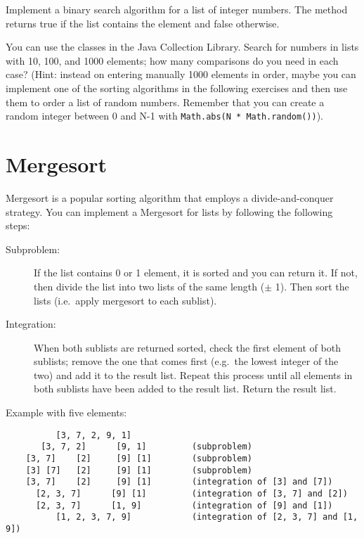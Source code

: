 \documentclass{article}
\begin{document}
Implement a binary search algorithm for a list of integer numbers. The
method returns true if the list contains the element and false
otherwise. 

You
can use the classes in the Java Collection Library. Search for numbers
in lists with 10, 100, and 1000 elements; how many comparisons do you
need in each case? (Hint: instead on entering manually 1000 elements
in order, maybe you can implement one of the sorting algorithms in the
following exercises and then use them to order a list of random
numbers. Remember that you can create a random integer between 0 and
N-1 with \verb+Math.abs(N * Math.random())+).

\section{Mergesort}
\label{sec:mergesort}

Mergesort is a popular sorting algorithm that employs a
divide-and-conquer strategy. You can implement a Mergesort for lists
by following the following steps: 

\begin{description}
\item[Subproblem: ] If the list contains 0 or 1 element, it is sorted
  and you can return it. If not, then divide the list into two lists
  of the same length ($\pm$ 1). Then sort the lists (i.e.~apply
  mergesort to each sublist).
\item[Integration: ] When both sublists are returned sorted, check the
  first element of both sublists; remove the one that comes first
  (e.g.~the lowest integer of the two) and add it to the result
  list. Repeat this process until all elements in both sublists have
  been added to the result list. Return the result list. 
\end{description}

Example with five elements: 

\begin{verbatim}
          [3, 7, 2, 9, 1]            
       [3, 7, 2]      [9, 1]         (subproblem)
    [3, 7]    [2]     [9] [1]        (subproblem)
    [3] [7]   [2]     [9] [1]        (subproblem)
    [3, 7]    [2]     [9] [1]        (integration of [3] and [7])
      [2, 3, 7]      [9] [1]         (integration of [3, 7] and [2])
      [2, 3, 7]      [1, 9]          (integration of [9] and [1])
          [1, 2, 3, 7, 9]            (integration of [2, 3, 7] and [1, 9])
\end{verbatim}
\end{document}
